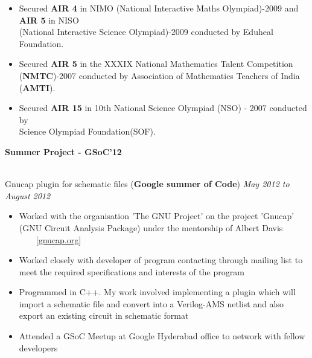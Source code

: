 \documentclass[a4paper,11pt]{article}
\newcommand{\resheading}[1]{{\small \colorbox{mygrey}{\begin{minipage}{0.975\textwidth}{\textbf{#1 \vphantom{p\^{E}}}}\end{minipage}}}}
\begin{document}
\begin{itemize}
   \item Secured \textbf{AIR 4} in NIMO (National Interactive Maths Olympiad)-2009 and \textbf{AIR 5} in NISO\\ (National Interactive Science Olympiad)-2009 conducted by Eduheal Foundation.\\[-0.8cm]
  \item Secured \textbf{AIR 5} in the  XXXIX National Mathematics Talent Competition (\textbf{NMTC})-2007 conducted by Association of Mathematics Teachers of India (\textbf{AMTI}).\\[-0.8cm]
  \item Secured \textbf{AIR 15} in 10th National Science Olympiad (NSO) - 2007 conducted by \\ Science Olympiad Foundation(SOF).
\end{itemize}

\resheading{\textbf{\large Summer Project - GSoC'12}} \\

\hspace{1mm}Gnucap plugin for schematic files (\textbf{Google summer of Code}) \emph{May 2012 to August 2012} \\[-0.6cm]
    \begin{itemize}
        \item Worked with the organisation 'The GNU Project' on the project 'Gnucap' (GNU Circuit Analysis Package) under the mentorship of Albert Davis \ \ \ \  [\url{gnucap.org}] \\[-0.6cm]
        \item Worked closely with developer of program contacting through mailing list to meet the required specifications and interests of the program
        \item Programmed in C++. My work involved implementing a plugin which will import a schematic file and convert into a Verilog-AMS netlist and also export an existing  circuit in schematic format
        \item Attended a GSoC Meetup at Google Hyderabad office to network with fellow developers
    \end{itemize}
\end{document}
